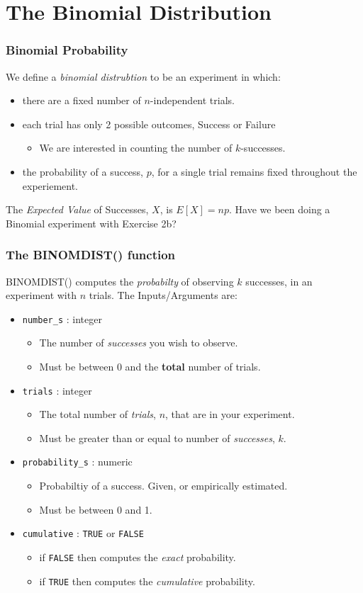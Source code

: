 \documentclass[12pt]{beamer}
\begin{document}
\section{The Binomial Distribution}
	\begin{frame}
		\frametitle{Binomial Probability}
		We define a \textit{binomial distrubtion} to be an experiment in which:
		\begin{itemize}
			\item there are a fixed number of $n$-independent trials. 
			\item each trial has only 2 possible outcomes, Success or Failure
				\begin{itemize}
					\item We are interested in counting the number of $k$-successes.
				\end{itemize}
			\item the probability of a success, $p$, for a single trial remains fixed throughout the experiement.
		\end{itemize}
	The \textit{Expected Value} of Successes, $X$, is $E\left[X\right]= np$.
	\bigskip
	Have we been doing a Binomial experiment with Exercise 2b? 
	
	
	\end{frame}
	\begin{frame}
		\frametitle{The BINOMDIST() function}
		BINOMDIST() computes the \textit{probabilty} of observing $k$ successes, in an experiment with $n$ trials. The Inputs/Arguments are:
		\begin{itemize}
			\item \texttt{number\_s} : integer
			\begin{itemize}
				\item The number of \textit{successes} you wish to observe.
				\item Must be between 0 and the \textbf{total} number of trials.
			\end{itemize}
			\item \texttt{trials} : integer
			\begin{itemize}
				\item The total number of \textit{trials}, $n$, that are in your experiment.
				\item  Must be greater than or equal to number of \textit{successes}, $k$.
			\end{itemize}
			\item \texttt{probability\_s} : numeric
			\begin{itemize}
				\item  Probabiltiy of a success. Given, or empirically estimated.
				\item Must be between 0 and 1.
			\end{itemize}
			\item \texttt{cumulative} : \texttt{TRUE} or \texttt{FALSE}
			\begin{itemize}
				\item if \texttt{FALSE} then computes the \textit{exact} probability.
				\item if \texttt{TRUE} then computes the \textit{cumulative} probability.
			\end{itemize}
		\end{itemize}
	\end{frame}
\end{document}
